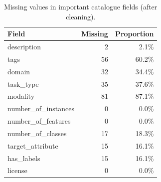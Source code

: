 \begin{table}[t]
\centering
\caption{Missing values in important catalogue fields (after cleaning).}
\label{tab:missing}
\scriptsize
\begin{tabular}{lrr}
\toprule
Field & Missing & Proportion \\
\midrule
description & 2 & 2.1\% \\
tags & 56 & 60.2\% \\
domain & 32 & 34.4\% \\
task\_type & 35 & 37.6\% \\
modality & 81 & 87.1\% \\
number\_of\_instances & 0 & 0.0\% \\
number\_of\_features & 0 & 0.0\% \\
number\_of\_classes & 17 & 18.3\% \\
target\_attribute & 15 & 16.1\% \\
has\_labels & 15 & 16.1\% \\
license & 0 & 0.0\% \\
\bottomrule
\end{tabular}
\end{table}
